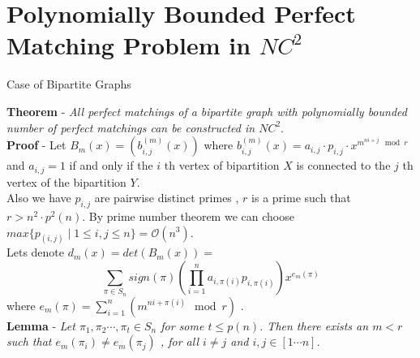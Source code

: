 \documentclass{beamer}
\begin{document}
\section{Polynomially Bounded Perfect Matching Problem in $NC^2$}
\begin{frame}[allowframebreaks]{Case of Bipartite Graphs}
	
		\textbf{Theorem} - \textit{All perfect matchings of a bipartite graph with polynomially bounded number of perfect matchings can be constructed in $NC^2$}.
		\\
		\textbf{Proof} - Let $B_m(x)=(b_{i,j}^{(m)}(x))$ 
		where $b_{i,j}^{(m)}(x)=a_{i,j}\cdot p_{i,j}\cdot x^{m^{ni+j} \mod r}$
		and $a_{i,j} = 1$ if and only if the $i$ th vertex of bipartition $X$ is connected to the $j$ th vertex of the bipartition $Y$. \\
		
		Also we have $p_{i,j}$ are pairwise distinct primes , $r$ is a prime such that $r>n^2\cdot p^2(n)$. By prime  number theorem we can choose $max\{p_{(i,j)}\mid 1 \leq i,j \leq n\}= \mathcal{O}(n^3)$.\\
		
		Lets denote $d_m(x)=det(B_m(x))=$ $$\sum_{\pi \in S_n} sign(\pi)(\prod_{i=1}^{n}a_{i,\pi(i)}p_{i,\pi(i)})x^{e_m(\pi)}$$
		where $e_m(\pi) = \sum_{i=1}^{n}(m^{ni+\pi(i)}\mod r)$  .\\
		
		\textbf{Lemma} - \textit{Let $\pi_1,\pi_2 \cdots ,\pi_t \in S_n$ for some $t \leq p(n)$. Then there exists an $m<r$ such that $e_m(\pi_i)\neq e_m(\pi_j)$ , for all $i \neq j$ and $i,j\in [1\cdots n]$.}\\
		

\end{frame}
\end{document}

